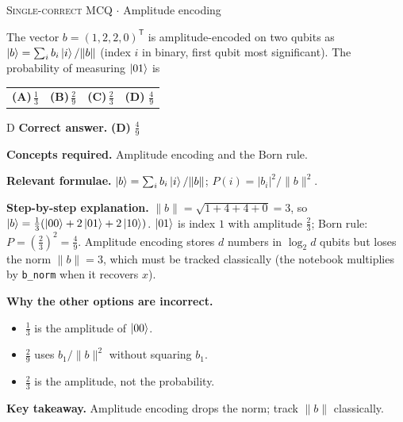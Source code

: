 \documentclass[11pt,a4paper]{article}
\newcommand{\optlabel}[1]{\textbf{(#1)}}
\newcommand{\correctlabel}[1]{\textcolor{okgreen}{\textbf{(#1)}\,\ding{51}}}
\newenvironment{qitem}[1]{\begin{list}{}{\setlength{\leftmargin}{3.3em}\setlength{\labelwidth}{3.1em}%
  \setlength{\labelsep}{0.2em}\setlength{\topsep}{3pt}\setlength{\parsep}{3pt}}\item[\textbf{Q.#1}\hfill]}{\end{list}}
\newcommand{\qsep}{\par\vspace{2pt}{\color{black!15}\hrule}\vspace{4pt}}
\newcommand{\qmeta}[2]{{\footnotesize\color{black!60}\textsc{#1} \;$\cdot$\; #2}\par}
\begin{document}
\begin{qitem}{12}
\qmeta{Single-correct MCQ}{Amplitude encoding}
The vector $b = (1, 2, 2, 0)^{\mathsf T}$ is amplitude-encoded on two qubits as $\ket b = \sum_ib_i\ket i/\|b\|$ (index $i$ in binary, first qubit most significant). The
probability of measuring $\ket{01}$ is
\par\smallskip\noindent\begin{tabularx}{\linewidth}{@{}*{4}{L}@{}}
\optlabel{A}\,$\tfrac13$ & \optlabel{B}\,$\tfrac29$ & \optlabel{C}\,$\tfrac23$ & \correctlabel{D}\,$\tfrac49$
\end{tabularx}
\end{qitem}
\begin{solbox}{D}
\textbf{\color{brand}Correct answer.} \textcolor{okgreen}{\textbf{(D)}} $\tfrac49$

\textbf{\color{brand}Concepts required.} Amplitude encoding and the Born rule.

\textbf{\color{brand}Relevant formulae.} $\ket b = \sum_ib_i\ket i/\|b\|$; $P(i) = |b_i|^2/\|b\|^2$.

\textbf{\color{brand}Step-by-step explanation.} $\|b\| = \sqrt{1 + 4 + 4 + 0} = 3$, so $\ket b = \tfrac13(\ket{00} + 2\ket{01} + 2\ket{10})$. $\ket{01}$ is index $1$ with amplitude $\tfrac23$; Born rule:
$P = (\tfrac23)^2 = \tfrac49$. Amplitude encoding stores $d$ numbers in $\log_2d$ qubits but loses the norm $\|b\| = 3$, which must be tracked classically
(the notebook multiplies by \texttt{b\_norm} when it recovers $x$).

\textbf{\color{brand}Why the other options are incorrect.}
\begin{itemize}[leftmargin=2.4em, itemsep=1pt, topsep=2pt]
\item[\textbf{(A)}] $\frac13$ is the amplitude of $\ket{00}$.
\item[\textbf{(B)}] $\frac29$ uses $b_1/\|b\|^2$ without squaring $b_1$.
\item[\textbf{(C)}] $\frac23$ is the amplitude, not the probability.
\end{itemize}
\textbf{\color{brand}Key takeaway.} Amplitude encoding drops the norm; track $\|b\|$ classically.
\end{solbox}
\qsep
\end{document}
